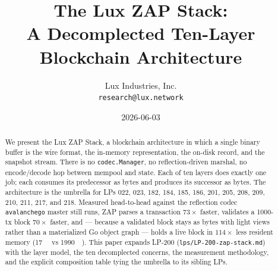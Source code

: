 \documentclass[11pt,a4paper]{article}
\title{The Lux ZAP Stack:\\
       A Decomplected Ten-Layer Blockchain Architecture}
\author{Lux Industries, Inc. \\
        \texttt{research@lux.network}}
\date{2026-06-03}
\begin{document}
\luxcoverpage

\begin{abstract}
We present the Lux ZAP Stack, a blockchain architecture in which a
single binary buffer is the wire format, the in-memory representation,
the on-disk record, and the snapshot stream. There is no
\texttt{codec.Manager}, no reflection-driven marshal, no encode/decode
hop between mempool and state. Each of ten layers does exactly one
job; each consumes its predecessor as bytes and produces its successor
as bytes. The architecture is the umbrella for LPs 022, 023, 182, 184,
185, 186, 201, 205, 208, 209, 210, 211, 217, and 218. Measured
head-to-head against the reflection codec \texttt{avalanchego} master
still runs, ZAP parses a transaction $73\times$ faster, validates a
\num{1000}-tx block $70\times$ faster, and --- because a validated block
stays as bytes with light views rather than a materialized Go object
graph --- holds a live block in $114\times$ less resident memory
(\SI{17}{\kilo\byte} vs \SI{1990}{\kilo\byte}). This paper expands
LP-200 (\texttt{lps/LP-200-zap-stack.md}) with the layer model, the ten
decomplected concerns, the measurement methodology, and the explicit
composition table tying the umbrella to its sibling LPs.
\end{abstract}

\tableofcontents
\newpage












\end{document}

